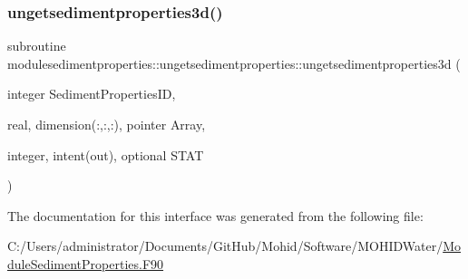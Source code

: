 \mbox{\label{interfacemodulesedimentproperties_1_1ungetsedimentproperties_ac3fc98142b99ecebcd9eb57b589eb00d}} 
\subsubsection{\texorpdfstring{ungetsedimentproperties3d()}{ungetsedimentproperties3d()}}
{\footnotesize\ttfamily subroutine modulesedimentproperties\+::ungetsedimentproperties\+::ungetsedimentproperties3d (\begin{DoxyParamCaption}\item[{integer}]{Sediment\+Properties\+ID,  }\item[{real, dimension(\+:,\+:,\+:), pointer}]{Array,  }\item[{integer, intent(out), optional}]{S\+T\+AT }\end{DoxyParamCaption})\hspace{0.3cm}{\ttfamily [private]}}



The documentation for this interface was generated from the following file\+:\begin{DoxyCompactItemize}
\item 
C\+:/\+Users/administrator/\+Documents/\+Git\+Hub/\+Mohid/\+Software/\+M\+O\+H\+I\+D\+Water/\mbox{\hyperlink{_module_sediment_properties_8_f90}{Module\+Sediment\+Properties.\+F90}}\end{DoxyCompactItemize}
